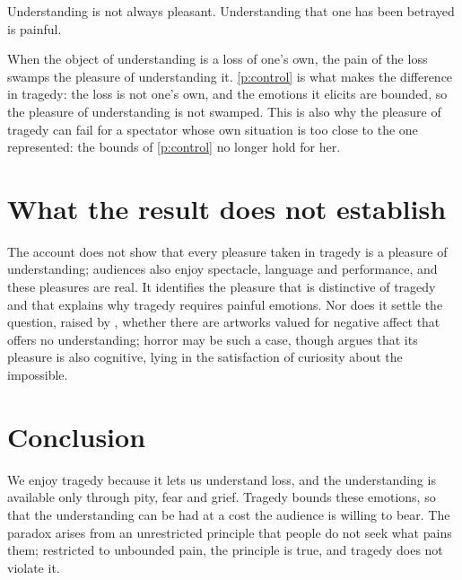 \documentclass{situationist-preprint}
\begin{document}
\begin{objection}
Understanding is not always pleasant. Understanding that one has been betrayed is painful.
\end{objection}

\begin{reply}
When the object of understanding is a loss of one's own, the pain of the loss swamps the pleasure of understanding it. \ref{p:control} is what makes the difference in tragedy: the loss is not one's own, and the emotions it elicits are bounded, so the pleasure of understanding is not swamped. This is also why the pleasure of tragedy can fail for a spectator whose own situation is too close to the one represented: the bounds of \ref{p:control} no longer hold for her.
\end{reply}

\section{What the result does not establish}

The account does not show that every pleasure taken in tragedy is a pleasure of understanding; audiences also enjoy spectacle, language and performance, and these pleasures are real. It identifies the pleasure that is distinctive of tragedy and that explains why tragedy requires painful emotions. Nor does it settle the question, raised by \citet{Smuts2009}, whether there are artworks valued for negative affect that offers no understanding; horror may be such a case, though \citet{Carroll1990} argues that its pleasure is also cognitive, lying in the satisfaction of curiosity about the impossible.

\section{Conclusion}

We enjoy tragedy because it lets us understand loss, and the understanding is available only through pity, fear and grief. Tragedy bounds these emotions, so that the understanding can be had at a cost the audience is willing to bear. The paradox arises from an unrestricted principle that people do not seek what pains them; restricted to unbounded pain, the principle is true, and tragedy does not violate it.
\end{document}
